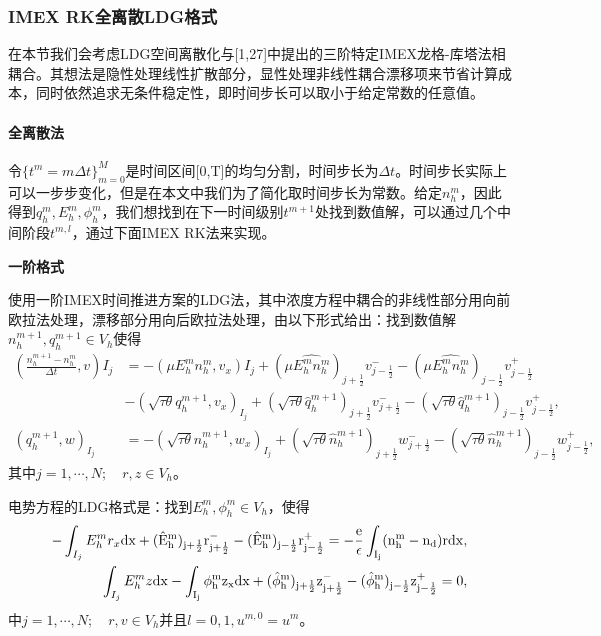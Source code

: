 \subsubsection{IMEX RK全离散LDG格式}
在本节我们会考虑LDG空间离散化与[1,27]中提出的三阶特定IMEX龙格-库塔法相耦合。其想法是隐性处理线性扩散部分，显性处理非线性耦合漂移项来节省计算成本，同时依然追求无条件稳定性，即时间步长可以取小于给定常数的任意值。
\paragraph{全离散法}
令$\{t^m = m\Delta t\}^M_{m = 0}$是时间区间[0,T]的均匀分割，时间步长为$\Delta t$。时间步长实际上可以一步步变化，但是在本文中我们为了简化取时间步长为常数。给定$n_h^m$，因此得到$q_h^m,E_h^m,\phi_h^m$，我们想找到在下一时间级别$t^{m+1}$处找到数值解，可以通过几个中间阶段$t^{m,l}$，通过下面IMEX RK法来实现。

\noindent \textbf{一阶格式}

使用一阶IMEX时间推进方案的LDG法，其中浓度方程中耦合的非线性部分用向前欧拉法处理，漂移部分用向后欧拉法处理，由以下形式给出：找到数值解$n_h^{m+1},q_h^{m+1}\in V_h$使得
\begin{align}
    (\frac{n_h^{m+1} - n_h^m}{\Delta t},v)I_j & = -(\mu E_h^mn_h^m, v_x)I_j + (\mu \hat{E_h^mn_h^m})_{j+\frac{1}{2}}v_{j-\frac{1}{2}}^- - (\mu\hat{E_h^mn_h^m})_{j-\frac{1}{2}}v^+_{j-\frac{1}{2}}                                         \nonumber                      \\
                                              & -(\sqrt{\tau \theta}q_h^{m+1},v_x)_{I_j} + (\sqrt{\tau \theta}\hat{q}_h^{m+1})_{j+\frac{1}{2}}v_{j+\frac{1}{2}}^- - (\sqrt{\tau \theta}\hat{q}_h^{m+1})_{j-\frac{1}{2}}v_{j-\frac{1}{2}}^+,  \label{weakForm:IMEX1 LDG 1} \\
    (q_h^{m+1},w)_{I_j}                       & = -(\sqrt{\tau \theta}n_h^{m+1},w_x)_{I_j} + (\sqrt{\tau \theta}\hat{n}_h^{m+1})_{j+\frac{1}{2}}w_{j+\frac{1}{2}}^- - (\sqrt{\tau \theta}\hat{n}_h^{m+1})_{j-\frac{1}{2}}w_{j-\frac{1}{2}}^+,\label{weakForm:IMEX1 LDG 2}
\end{align}
其中$j = 1,\cdots,N;\quad r,z \in V_h$。

电势方程的LDG格式是：找到$E_h^{m},\phi_h^{m} \in V_h$，使得
\begin{align}
    -\int_{I_j} E_h^{m}r_x \rm{d}x + (\hat{E}_h^{m})_{j+\frac{1}{2}}r_{j+\frac{1}{2}}^- - (\hat{E}_h^{m})_{j-\frac{1}{2}}r_{j-\frac{1}{2}}^+ = -\frac{e}{\epsilon}\int_{I_j}(n_h^{m} - n_d) r\rm{d} x, \label{equation:IMEX1 LDG:EPE 1} \\
    \int_{I_j} E_h^{m}z \rm{d}x - \int_{I_j} \phi_h^{m}z_x \rm{d}x  + (\hat{\phi}_h^{m})_{j+\frac{1}{2}}z^-_{j+\frac{1}{2}} - (\hat{\phi}_h^{m})_{j-\frac{1}{2}}z_{j-\frac{1}{2}}^+  = 0,\label{equation:IMEX1 LDG:EPE 2}
\end{align}
中$j = 1,\cdots,N;\quad r,v \in V_h$并且$l = 0,1, u^{m,0} = u^m$。

